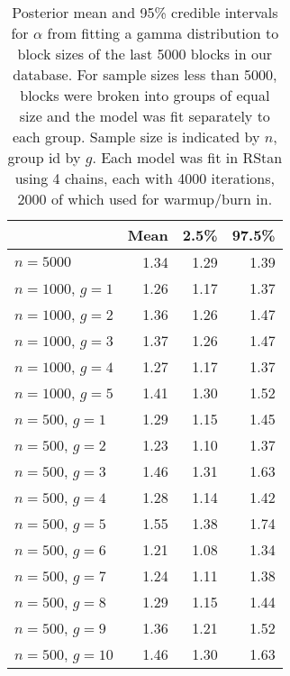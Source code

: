 \documentclass{article}
\begin{document}
\begin{table}[ht]
\centering
\begin{tabular}{lrrr}
  \hline
 & Mean & 2.5\% & 97.5\% \\ 
  \hline
       $n=5000$ & 1.34 & 1.29 & 1.39 \\ 
$n=1000$, $g=1$ & 1.26 & 1.17 & 1.37 \\ 
$n=1000$, $g=2$ & 1.36 & 1.26 & 1.47 \\ 
$n=1000$, $g=3$ & 1.37 & 1.26 & 1.47 \\ 
$n=1000$, $g=4$ & 1.27 & 1.17 & 1.37 \\ 
$n=1000$, $g=5$ & 1.41 & 1.30 & 1.52 \\ 
 $n=500$, $g=1$ & 1.29 & 1.15 & 1.45 \\ 
 $n=500$, $g=2$ & 1.23 & 1.10 & 1.37 \\ 
 $n=500$, $g=3$ & 1.46 & 1.31 & 1.63 \\ 
 $n=500$, $g=4$ & 1.28 & 1.14 & 1.42 \\ 
 $n=500$, $g=5$ & 1.55 & 1.38 & 1.74 \\ 
 $n=500$, $g=6$ & 1.21 & 1.08 & 1.34 \\ 
 $n=500$, $g=7$ & 1.24 & 1.11 & 1.38 \\ 
 $n=500$, $g=8$ & 1.29 & 1.15 & 1.44 \\ 
 $n=500$, $g=9$ & 1.36 & 1.21 & 1.52 \\ 
 $n=500$, $g=10$ & 1.46 & 1.30 & 1.63 \\ 
 \hline
\end{tabular}
\caption{Posterior mean and 95\% credible intervals for $\alpha$ from fitting a gamma distribution to block sizes of the last 5000 blocks in our database. For sample sizes less than 5000, blocks were broken into groups of equal size and the model was fit separately to each group. Sample size is indicated by $n$, group id by $g$. Each model was fit in RStan \citep{rstan-software:2015,stan-software:2015} using 4 chains, each with 4000 iterations, 2000 of which used for warmup/burn in.}
\label{tab:gammafit}
\end{table}
\end{document}
